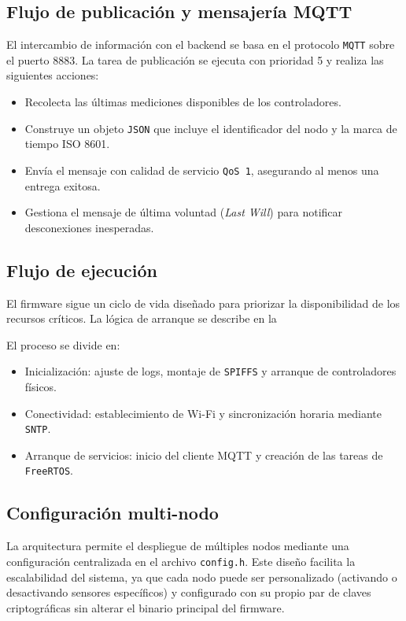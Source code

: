 \subsection{Flujo de publicación y mensajería MQTT}

El intercambio de información con el backend se basa en el protocolo \texttt{MQTT} sobre el puerto 8883. La tarea de publicación se ejecuta con prioridad 5 y realiza las siguientes acciones:

\begin{itemize}
    \item Recolecta las últimas mediciones disponibles de los controladores.
    \item Construye un objeto \texttt{JSON} que incluye el identificador del nodo y la marca de tiempo ISO 8601.
    \item Envía el mensaje con calidad de servicio \texttt{QoS 1}, asegurando al menos una entrega exitosa.
    \item Gestiona el mensaje de última voluntad (\textit{Last Will}) para notificar desconexiones inesperadas.
\end{itemize}

\subsection{Flujo de ejecución}

El firmware sigue un ciclo de vida diseñado para priorizar la disponibilidad de los recursos críticos. La lógica de arranque se describe en la

El proceso se divide en:

\begin{itemize}
    \item Inicialización: ajuste de logs, montaje de \texttt{SPIFFS} y arranque de controladores físicos.
    \item Conectividad: establecimiento de Wi-Fi y sincronización horaria mediante \texttt{SNTP}.
    \item Arranque de servicios: inicio del cliente MQTT y creación de las tareas de \texttt{FreeRTOS}.
\end{itemize}

\subsection{Configuración multi-nodo}

La arquitectura permite el despliegue de múltiples nodos mediante una configuración centralizada en el archivo \texttt{config.h}. Este diseño facilita la escalabilidad del sistema, ya que cada nodo puede ser personalizado (activando o desactivando sensores específicos) y configurado con su propio par de claves criptográficas sin alterar el binario principal del firmware.

